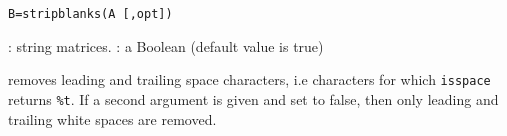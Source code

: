 
\begin{mandesc}
\end{mandesc}
\begin{calling_sequence}
\begin{verbatim}
B=stripblanks(A [,opt])
\end{verbatim}
\end{calling_sequence}

\begin{parameters}
  \begin{varlist}
    : string matrices.
    : a Boolean (default value is true)
  \end{varlist}
\end{parameters}

\begin{mandescription}
removes leading and trailing space characters, i.e characters for which 
\verb+isspace+ returns \verb+%t+. If a second argument is given and set to false, 
then only leading and trailing white spaces are removed.
\end{mandescription}

